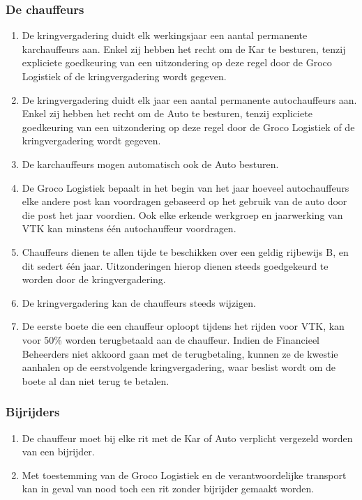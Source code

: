     \subsubsection{De chauffeurs}
    \begin{enumerate}
    \item De kringvergadering duidt elk werkingsjaar een aantal permanente karchauffeurs aan. Enkel zij hebben het recht om de Kar te besturen, tenzij expliciete goedkeuring van een uitzondering op deze regel door de Groco Logistiek of de kringvergadering wordt gegeven. 
    \item De kringvergadering duidt elk jaar een aantal permanente autochauffeurs aan. Enkel zij hebben het recht om de Auto te besturen, tenzij expliciete goedkeuring van een uitzondering op deze regel door de Groco Logistiek of de kringvergadering wordt gegeven.
    \item De karchauffeurs mogen automatisch ook de Auto besturen.
    \item De Groco Logistiek bepaalt in het begin van het jaar hoeveel autochauffeurs elke andere post kan voordragen gebaseerd op het gebruik van de auto door die post het jaar voordien. Ook elke erkende werkgroep en jaarwerking van VTK kan minstens \'e\'en autochauffeur voordragen.
    \item Chauffeurs dienen te allen tijde te beschikken over een geldig rijbewijs B, en dit sedert \'e\'en jaar. Uitzonderingen hierop dienen steeds goedgekeurd te worden door de kringvergadering.
    \item De kringvergadering kan de chauffeurs steeds wijzigen.
    \item De eerste boete die een chauffeur oploopt tijdens het rijden voor VTK, kan voor 50\% worden terugbetaald aan de chauffeur. Indien de Financieel Beheerders niet akkoord gaan met de terugbetaling, kunnen ze de kwestie aanhalen op de eerstvolgende kringvergadering, waar beslist wordt om de boete al dan niet terug te betalen. 
    \end{enumerate}

    \subsubsection{Bijrijders}
    \begin{enumerate}
    \item De chauffeur moet bij elke rit met de Kar of Auto verplicht vergezeld worden van een bijrijder.
    \item Met toestemming van de Groco Logistiek en de verantwoordelijke transport kan in geval van nood toch een rit zonder bijrijder gemaakt worden.
    \end{enumerate}

